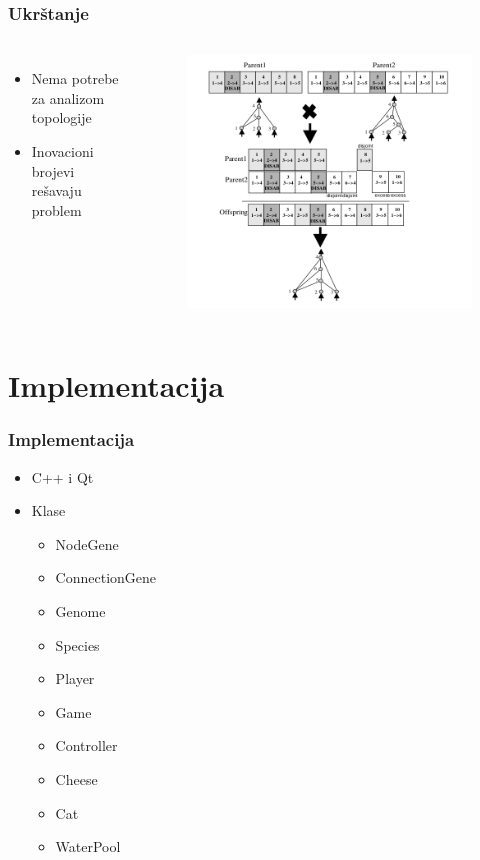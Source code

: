\documentclass{beamer}
\begin{document}
\begin{frame} 
\frametitle{Ukrštanje}
\begin{columns}[c]
\begin{itemize}
\item Nema potrebe za analizom topologije
\item Inovacioni brojevi rešavaju problem
\end{itemize}

\begin{figure}
\includegraphics[width=1\linewidth]{images/matching.png}
\end{figure}
\end{columns}
\end{frame}

\section{Implementacija}
\begin{frame} 
\frametitle{Implementacija}
\begin{itemize}
\item C++ i Qt
\item Klase
\begin{itemize}
\item NodeGene
\item ConnectionGene
\item Genome
\item Species
\item Player
\item Game
\item Controller
\item Cheese
\item Cat
\item WaterPool
\end{itemize}
\end{itemize}
\end{frame}
\end{document}
